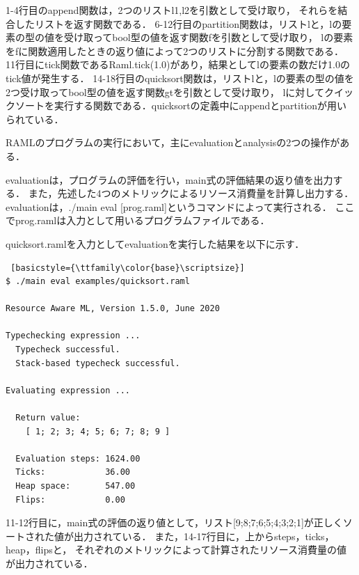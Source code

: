 \documentclass{kuisthesis}
\begin{document}
1-4行目のappend関数は，2つのリストl1,l2を引数として受け取り，
それらを結合したリストを返す関数である．
6-12行目のpartition関数は，リストlと，lの要素の型の値を受け取ってbool型の値を返す関数fを引数として受け取り，
lの要素をfに関数適用したときの返り値によって2つのリストに分割する関数である．
11行目にtick関数であるRaml.tick(1.0)があり，結果としてlの要素の数だけ1.0のtick値が発生する．
14-18行目のquicksort関数は，リストlと，lの要素の型の値を2つ受け取ってbool型の値を返す関数gtを引数として受け取り，
lに対してクイックソートを実行する関数である．quicksortの定義中にappendとpartitionが用いられている．

RAMLのプログラムの実行において，主にevaluationとanalysisの2つの操作がある．

evaluationは，プログラムの評価を行い，main式の評価結果の返り値を出力する．
また，先述した4つのメトリックによるリソース消費量を計算し出力する．
evaluationは，./main eval [prog.raml]というコマンドによって実行される．
ここでprog.ramlは入力として用いるプログラムファイルである．

quicksort.ramlを入力としてevaluationを実行した結果を以下に示す．
\\

\begin{lstlisting} [basicstyle={\ttfamily\color{base}\scriptsize}]
$ ./main eval examples/quicksort.raml

Resource Aware ML, Version 1.5.0, June 2020

Typechecking expression ...
  Typecheck successful.
  Stack-based typecheck successful.

Evaluating expression ...

  Return value:
    [ 1; 2; 3; 4; 5; 6; 7; 8; 9 ]

  Evaluation steps: 1624.00
  Ticks:            36.00
  Heap space:       547.00
  Flips:            0.00

\end{lstlisting}

11-12行目に，main式の評価の返り値として，リスト[9;8;7;6;5;4;3;2;1]が正しくソートされた値が出力されている．
また，14-17行目に，上からsteps，ticks，heap，flipsと，
それぞれのメトリックによって計算されたリソース消費量の値が出力されている．
\end{document}
